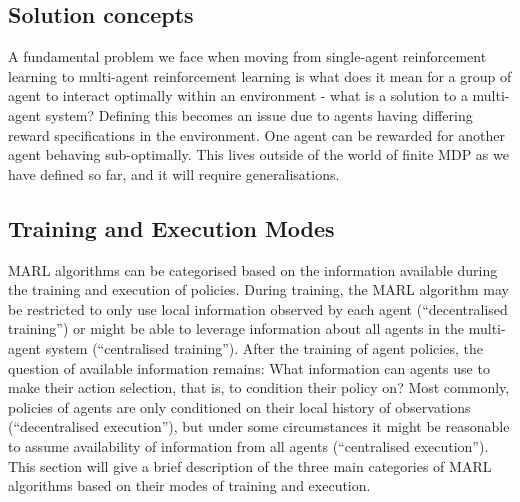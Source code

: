 \documentclass{article}
\begin{document}
\subsection{Solution concepts}\label{sec:solution_concepts}


A fundamental problem we face when moving from single-agent reinforcement learning to multi-agent reinforcement learning is what does it mean for a group of agent to interact optimally within an environment - what is a solution to a multi-agent system? Defining this becomes an issue due to agents having differing reward specifications in the environment. One agent can be rewarded for another agent behaving sub-optimally. This lives outside of the world of finite MDP as we have defined so far, and it will require generalisations.

\subsection{Training and Execution Modes}


MARL algorithms can be categorised based on the information available during the training and execution of policies. During training, the MARL algorithm may be restricted to only use local information observed by each agent (``decentralised training'') or might be able to leverage information about all agents in the multi-agent system (``centralised training''). After the training of agent policies, the question of available information remains: What information can agents use to make their action selection, that is, to condition their policy on? Most commonly, policies of agents are only conditioned on their local history of observations (``decentralised execution''), but under some circumstances it might be reasonable to assume availability of information from all agents (``centralised execution''). This section will give a brief description of the three main categories of MARL algorithms based on their modes of training and execution.  
\end{document}
